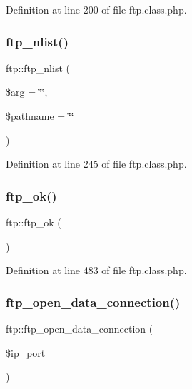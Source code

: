 Definition at line 200 of file ftp.\+class.\+php.

\mbox{\label{classftp_a1075a24d95dc5bcfe3886ffcbd606506}} 
\subsubsection{\texorpdfstring{ftp\+\_\+nlist()}{ftp\_nlist()}}
{\footnotesize\ttfamily ftp\+::ftp\+\_\+nlist (\begin{DoxyParamCaption}\item[{}]{\$arg = {\ttfamily \char`\"{}\char`\"{}},  }\item[{}]{\$pathname = {\ttfamily \char`\"{}\char`\"{}} }\end{DoxyParamCaption})}



Definition at line 245 of file ftp.\+class.\+php.

\mbox{\label{classftp_a91d52ff0c56f9374cbaeae48cb54f604}} 
\subsubsection{\texorpdfstring{ftp\+\_\+ok()}{ftp\_ok()}}
{\footnotesize\ttfamily ftp\+::ftp\+\_\+ok (\begin{DoxyParamCaption}{ }\end{DoxyParamCaption})}



Definition at line 483 of file ftp.\+class.\+php.

\mbox{\label{classftp_a493907034238b378487fba4c25af0509}} 
\subsubsection{\texorpdfstring{ftp\+\_\+open\+\_\+data\+\_\+connection()}{ftp\_open\_data\_connection()}}
{\footnotesize\ttfamily ftp\+::ftp\+\_\+open\+\_\+data\+\_\+connection (\begin{DoxyParamCaption}\item[{}]{\$ip\+\_\+port }\end{DoxyParamCaption})}



